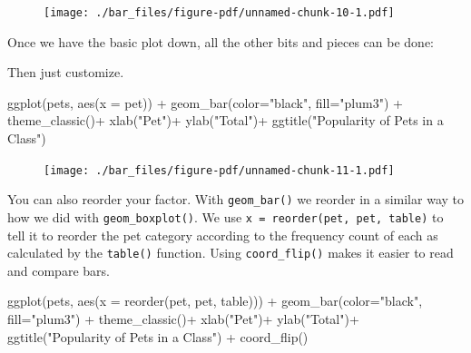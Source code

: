 \documentclass[
  letterpaper,
  DIV=11,
  numbers=noendperiod]{scrreprt}
\newenvironment{Shaded}{\begin{snugshade}}{\end{snugshade}}
\newcommand{\AttributeTok}[1]{\textcolor[rgb]{0.40,0.45,0.13}{#1}}
\newcommand{\FunctionTok}[1]{\textcolor[rgb]{0.28,0.35,0.67}{#1}}
\newcommand{\NormalTok}[1]{\textcolor[rgb]{0.00,0.23,0.31}{#1}}
\newcommand{\SpecialCharTok}[1]{\textcolor[rgb]{0.37,0.37,0.37}{#1}}
\newcommand{\StringTok}[1]{\textcolor[rgb]{0.13,0.47,0.30}{#1}}
\begin{document}
\begin{figure}[H]

{\centering \texttt{[image: ./bar\_files/figure-pdf/unnamed-chunk-10-1.pdf]}

}

\end{figure}

Once we have the basic plot down, all the other bits and pieces can be
done:

Then just customize.

\begin{Shaded}
\begin{Highlighting}[]
\FunctionTok{ggplot}\NormalTok{(pets, }\FunctionTok{aes}\NormalTok{(}\AttributeTok{x =}\NormalTok{ pet)) }\SpecialCharTok{+} 
  \FunctionTok{geom\_bar}\NormalTok{(}\AttributeTok{color=}\StringTok{"black"}\NormalTok{, }\AttributeTok{fill=}\StringTok{"plum3"}\NormalTok{) }\SpecialCharTok{+}
  \FunctionTok{theme\_classic}\NormalTok{()}\SpecialCharTok{+}
  \FunctionTok{xlab}\NormalTok{(}\StringTok{"Pet"}\NormalTok{)}\SpecialCharTok{+}
  \FunctionTok{ylab}\NormalTok{(}\StringTok{"Total"}\NormalTok{)}\SpecialCharTok{+}
  \FunctionTok{ggtitle}\NormalTok{(}\StringTok{"Popularity of Pets in a Class"}\NormalTok{)}
\end{Highlighting}
\end{Shaded}

\begin{figure}[H]

{\centering \texttt{[image: ./bar\_files/figure-pdf/unnamed-chunk-11-1.pdf]}

}

\end{figure}

You can also reorder your factor. With \texttt{geom\_bar()} we reorder
in a similar way to how we did with \texttt{geom\_boxplot()}. We use
\texttt{x\ =\ reorder(pet,\ pet,\ table)} to tell it to reorder the pet
category according to the frequency count of each as calculated by the
\texttt{table()} function. Using \texttt{coord\_flip()} makes it easier
to read and compare bars.

\begin{Shaded}
\begin{Highlighting}[]
\FunctionTok{ggplot}\NormalTok{(pets, }\FunctionTok{aes}\NormalTok{(}\AttributeTok{x =} \FunctionTok{reorder}\NormalTok{(pet, pet, table))) }\SpecialCharTok{+} 
  \FunctionTok{geom\_bar}\NormalTok{(}\AttributeTok{color=}\StringTok{"black"}\NormalTok{, }\AttributeTok{fill=}\StringTok{"plum3"}\NormalTok{) }\SpecialCharTok{+}
  \FunctionTok{theme\_classic}\NormalTok{()}\SpecialCharTok{+}
  \FunctionTok{xlab}\NormalTok{(}\StringTok{"Pet"}\NormalTok{)}\SpecialCharTok{+}
  \FunctionTok{ylab}\NormalTok{(}\StringTok{"Total"}\NormalTok{)}\SpecialCharTok{+}
  \FunctionTok{ggtitle}\NormalTok{(}\StringTok{"Popularity of Pets in a Class"}\NormalTok{) }\SpecialCharTok{+}
  \FunctionTok{coord\_flip}\NormalTok{()}
\end{Highlighting}
\end{Shaded}
\end{document}
